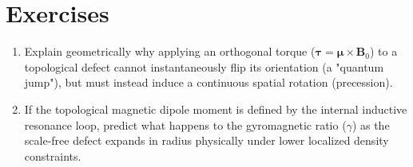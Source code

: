 \section*{Exercises}
\begin{enumerate}
    \item Explain geometrically why applying an orthogonal torque ($\boldsymbol{\tau} = \boldsymbol{\mu} \times \mathbf{B}_0$) to a topological defect cannot instantaneously flip its orientation (a "quantum jump"), but must instead induce a continuous spatial rotation (precession).
    \item If the topological magnetic dipole moment is defined by the internal inductive resonance loop, predict what happens to the gyromagnetic ratio ($\gamma$) as the scale-free defect expands in radius physically under lower localized density constraints.
\end{enumerate}
